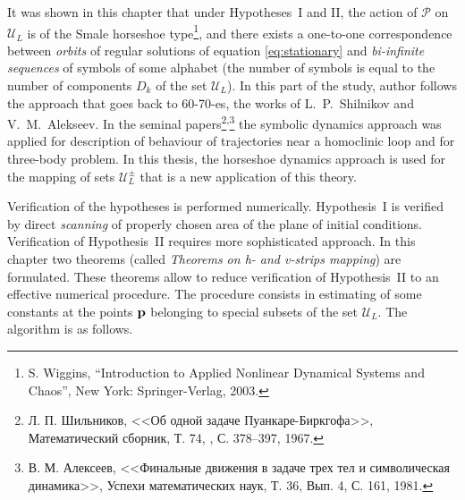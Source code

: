 \documentclass[candidate, href, colorlinks]{disser}
\begin{document}
It was shown in this chapter that under Hypotheses~I and II, the action of $\mathcal{P}$ on $\mathscr{U}_L$ is of the Smale horseshoe type\footnote{S. Wiggins, ``Introduction to Applied Nonlinear Dynamical Systems and Chaos'', New York: Springer-Verlag, 2003.}, and there exists a one-to-one correspondence between {\it orbits} of regular solutions of equation \eqref{eq:stationary} and {\it bi-infinite sequences} of symbols of some alphabet (the number of symbols is equal to the number of components $D_k$ of the set $\mathscr{U}_L$).
In this part of the study, author follows the approach that goes back to 60-70-es, the works of L.~P.~Shilnikov and V.~M.~Alekseev.
In the seminal papers\footnote{Л. П. Шильников, <<Об одной задаче Пуанкаре-Биркгофа>>, Математический сборник, Т. 74, , С. 378--397,  1967.}\textsuperscript{,}\footnote{В. М. Алексеев, <<Финальные движения в задаче трех тел и символическая динамика>>, Успехи математических наук, Т. 36, Вып. 4, С. 161, 1981.} the symbolic dynamics approach was applied for description of behaviour of trajectories near a homoclinic loop and for three-body problem.
In this thesis, the horseshoe dynamics approach is used for the mapping of sets $\mathscr{U}_L^{\pm}$ that is a new application of this theory.


Verification of the hypotheses is performed numerically.
Hypothesis~I is verified by direct {\it scanning} of properly chosen area of the plane of initial conditions.
Verification of Hypothesis~II requires more sophisticated approach.
In this chapter two theorems (called {\it Theorems on h- and v-strips mapping}) are formulated.
These theorems allow to reduce verification of Hypothesis~II to an effective numerical procedure.
The procedure consists in estimating of some constants at the points $\vb{p}$ belonging to special subsets of the set $\mathscr{U}_L$.
The algorithm is as follows.
\end{document}
